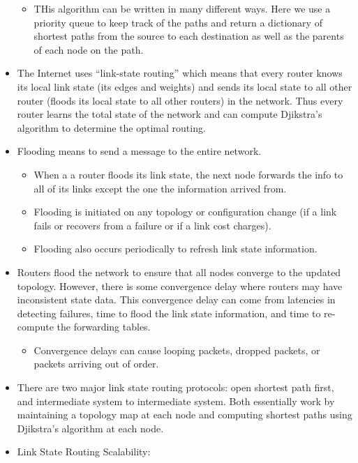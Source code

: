 \begin{itemize}
  \begin{itemize}
  \tightlist
  \item
    THis algorithm can be written in many different ways. Here we use a
    priority queue to keep track of the paths and return a dictionary of
    shortest paths from the source to each destination as well as the
    parents of each node on the path.
  \end{itemize}
\item
  The Internet uses ``link-state routing'' which means that every router
  knows its local link state (its edges and weights) and sends its local
  state to all other router (floods its local state to all other
  routers) in the network. Thus every router learns the total state of
  the network and can compute Djikstra's algorithm to determine the
  optimal routing.
\item
  Flooding means to send a message to the entire network.

  \begin{itemize}
  \tightlist
  \item
    When a a router floods its link state, the next node forwards the
    info to all of its links except the one the information arrived
    from.
  \item
    Flooding is initiated on any topology or configuration change (if a
    link fails or recovers from a failure or if a link cost charges).
  \item
    Flooding also occurs periodically to refresh link state information.
  \end{itemize}
\item
  Routers flood the network to ensure that all nodes converge to the
  updated topology. However, there is some convergence delay where
  routers may have inconsistent state data. This convergence delay can
  come from latencies in detecting failures, time to flood the link
  state information, and time to re-compute the forwarding tables.

  \begin{itemize}
  \tightlist
  \item
    Convergence delays can cause looping packets, dropped packets, or
    packets arriving out of order.
  \end{itemize}
\item
  There are two major link state routing protocols: open shortest path
  first, and intermediate system to intermediate system. Both
  essentially work by maintaining a topology map at each node and
  computing shortest paths using Djikstra's algorithm at each node.
\item
  Link State Routing Scalability:


\end{itemize}
